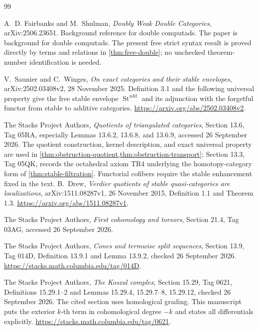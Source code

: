 \documentclass[11pt]{article}
\theoremstyle{definition}
\theoremstyle{remark}
\begin{document}
\begin{thebibliography}{99}
A.~D. Fairbanks and M.~Shulman,
\emph{Doubly Weak Double Categories},
arXiv:2506.23651. Background reference for double computads.
The paper is background for double computads. The present free strict syntax result is proved directly by terms and relations in \cref{thm:free-double}; no unchecked theorem-number identification is needed.

V.~Saunier and C.~Winges,
\emph{On exact categories and their stable envelopes},
arXiv:2502.03408v2, 28 November 2025.
Definition 3.1 and the following universal property give the free stable envelope $\operatorname{St}^{\mathrm{add}}$ and its adjunction with the forgetful functor from stable to additive categories.
\url{https://arxiv.org/abs/2502.03408v2}.

The Stacks Project Authors,
\emph{Quotients of triangulated categories}, Section 13.6, Tag 05RA, especially Lemmas 13.6.2, 13.6.8, and 13.6.9, accessed 26 September 2026.
The quotient construction, kernel description, and exact universal property are used in \cref{thm:obstruction-quotient,thm:obstruction-transport}; Section 13.3, Tag 05QK, records the octahedral axiom TR4 underlying the homotopy-category form of \cref{thm:stable-filtration}. Functorial cofibers require the stable enhancement fixed in the text.
B.~Drew,
\emph{Verdier quotients of stable quasi-categories are localizations},
arXiv:1511.08287v1, 26 November 2015, Definition 1.1 and Theorem 1.3.
\url{https://arxiv.org/abs/1511.08287v1}.

The Stacks Project Authors,
\emph{First cohomology and torsors}, Section 21.4, Tag 03AG, accessed 26 September 2026.

The Stacks Project Authors,
\emph{Cones and termwise split sequences}, Section 13.9, Tag 014D,
Definition 13.9.1 and Lemma 13.9.2, checked 26 September 2026.
\url{https://stacks.math.columbia.edu/tag/014D}.

The Stacks Project Authors,
\emph{The Koszul complex}, Section 15.29, Tag 0621,
Definitions 15.29.1--2 and Lemmas 15.29.4, 15.29.7--8, 15.29.12,
checked 26 September 2026.
The cited section uses homological grading. This manuscript puts the exterior
$k$-th term in cohomological degree $-k$ and states all differentials explicitly.
\url{https://stacks.math.columbia.edu/tag/0621}.


\end{thebibliography}
\end{document}
